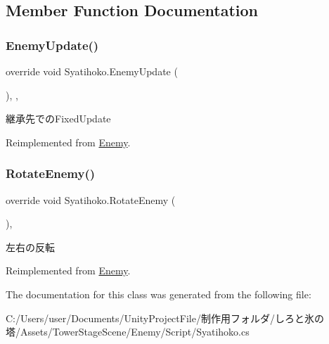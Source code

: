 \subsection{Member Function Documentation}
\mbox{\label{class_syatihoko_a921cf2c05d610f19214fb476c9ff8a6c}} 
\subsubsection{\texorpdfstring{Enemy\+Update()}{EnemyUpdate()}}
{\footnotesize\ttfamily override void Syatihoko.\+Enemy\+Update (\begin{DoxyParamCaption}{ }\end{DoxyParamCaption})\hspace{0.3cm}{\ttfamily [inline]}, {\ttfamily [protected]}, {\ttfamily [virtual]}}



継承先での\+Fixed\+Update 



Reimplemented from \hyperlink{class_enemy_ab19a73003a5b443ba93f4b6a45c0abad}{Enemy}.

\mbox{\label{class_syatihoko_ab4c8b474dcba39edb7ed80e5149ee39c}} 
\subsubsection{\texorpdfstring{Rotate\+Enemy()}{RotateEnemy()}}
{\footnotesize\ttfamily override void Syatihoko.\+Rotate\+Enemy (\begin{DoxyParamCaption}{ }\end{DoxyParamCaption})\hspace{0.3cm}{\ttfamily [inline]}, {\ttfamily [virtual]}}



左右の反転 



Reimplemented from \hyperlink{class_enemy_a2a0e665070fd362bd3ab2f2962ebff93}{Enemy}.



The documentation for this class was generated from the following file\+:\begin{DoxyCompactItemize}
\item 
C\+:/\+Users/user/\+Documents/\+Unity\+Project\+File/制作用フォルダ/しろと氷の塔/\+Assets/\+Tower\+Stage\+Scene/\+Enemy/\+Script/Syatihoko.\+cs\end{DoxyCompactItemize}
